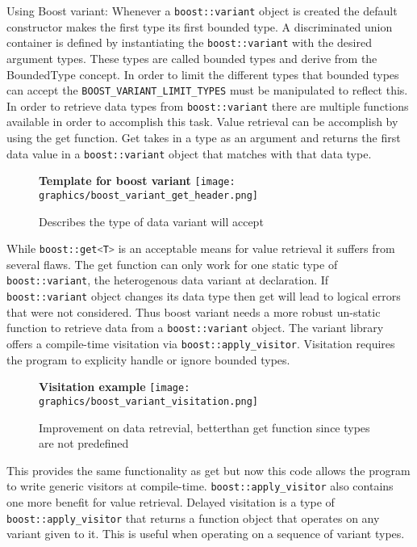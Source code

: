 \documentclass[letterpaper, 12pt]{article}
\newcommand{\inlinecode}[1]{\colorbox{codegrey}{\lstinline[language=C++]{#1}}}
\begin{document}
Using Boost variant:
Whenever a \inlinecode{boost::variant} object is created the default constructor makes the first type its first bounded type.
A discriminated union container is defined by instantiating the \inlinecode{boost::variant} with the desired argument types.
These types are called bounded types and derive from the BoundedType concept. In order to limit the different
types that bounded types can accept the \inlinecode{BOOST_VARIANT_LIMIT_TYPES} must be manipulated to reflect this.
In order to retrieve data types from \inlinecode{boost::variant} there are multiple functions available in order to accomplish this task.
Value retrieval can be accomplish by using the get function. Get takes in a type as an argument and returns the first
data value in a \inlinecode{boost::variant} object that matches with that data type.
\par\vspace{\baselineskip}
\begin{figure}
  \centering
  \textbf{Template for boost variant}
  \texttt{[image: graphics/boost\_variant\_get\_header.png]}
  \cite{boostvariant}
  \caption{Describes the type of data variant will accept}
\end{figure}

While \inlinecode{boost::get<T>} is an acceptable means for value retrieval it suffers from several flaws.
The get function can only work for one static type of \inlinecode{boost::variant},
the heterogenous data variant at declaration. If \inlinecode{boost::variant} object
changes its data type then get will lead to logical errors that were not considered.
Thus boost variant needs a more robust un-static function to retrieve
data from a \inlinecode{boost::variant} object. The variant library offers a compile-time visitation
via \inlinecode{boost::apply_visitor}. Visitation requires the program to explicity handle or ignore bounded types.
\par\vspace{\baselineskip}

\begin{figure}
  \centering
  \textbf{Visitation example}
  \texttt{[image: graphics/boost\_variant\_visitation.png]}
  \cite{boostvariant}
  \caption{Improvement on data retrevial, betterthan get function since types are not predefined}
\end{figure}

This provides the same functionality as get but now this code allows the program to write
generic visitors at compile-time. \inlinecode{boost::apply_visitor} also contains one more benefit for
value retrieval. Delayed visitation is a type of \inlinecode{boost::apply_visitor} that returns
a function object that operates on any variant given to it. This is useful when operating on a sequence of
variant types.
\par\vspace{\baselineskip}
\end{document}
